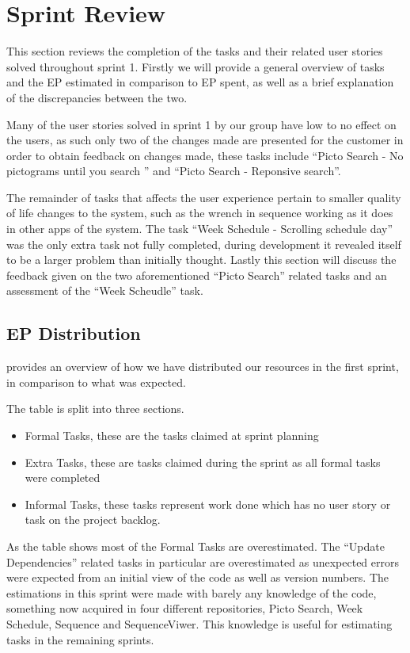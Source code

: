 \section{Sprint Review}\label{s1rev}
This section reviews the completion of the tasks and their related user stories solved throughout sprint 1.
Firstly we will provide a general overview of tasks and the EP estimated in comparison to EP spent, as well as a brief explanation of the discrepancies between the two.

Many of the user stories solved in sprint 1 by our group have low to no effect on the users, as such only two of the changes made are presented for the customer in order to obtain feedback on changes made, these tasks include ``Picto Search - No pictograms until you search '' and ``Picto Search - Reponsive search''.

The remainder of tasks that affects the user experience pertain to smaller quality of life changes to the system, such as the wrench in sequence working as it does in other apps of the system.
The task ``Week Schedule - Scrolling schedule day'' was the only extra task not fully completed, during development it revealed itself to be a larger problem than initially thought.
Lastly this section will discuss the feedback given on the two aforementioned ``Picto Search'' related tasks and an assessment of the ``Week Scheudle'' task.

\subsection{EP Distribution}
 provides an overview of how we have distributed our resources in the first sprint, in comparison to what was expected.

The table is split into three sections.
\begin{itemize}
    \item Formal Tasks, these are the tasks claimed at sprint planning
    \item Extra Tasks, these are tasks claimed during the sprint as all formal tasks were completed
    \item Informal Tasks, these tasks represent work done which has no user story or task on the project backlog.
\end{itemize}
As the table shows most of the Formal Tasks are overestimated.
The ``Update Dependencies'' related tasks in particular are overestimated as unexpected errors were expected from an initial view of the code as well as version numbers.
The estimations in this sprint were made with barely any knowledge of the code, something now acquired in four different repositories, Picto Search, Week Schedule, Sequence and SequenceViwer.
This knowledge is useful for estimating tasks in the remaining sprints.

